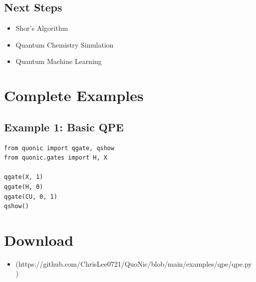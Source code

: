 \documentclass[12pt,a4paper]{article}
\begin{document}
\subsection{Next Steps}
\begin{itemize}
  \item Shor's Algorithm
  \item Quantum Chemistry Simulation
  \item Quantum Machine Learning
\end{itemize}

\section{Complete Examples}

\subsection{Example 1: Basic QPE}

\begin{verbatim}
from quonic import qgate, qshow
from quonic.gates import H, X

qgate(X, 1)
qgate(H, 0)
qgate(CU, 0, 1)
qshow()
\end{verbatim}

\section{Download}

\begin{itemize}
  \item [qpe.py](https://github.com/ChrisLee0721/QuoNic/blob/main/examples/qpe/qpe.py)
\end{itemize}
\end{document}
